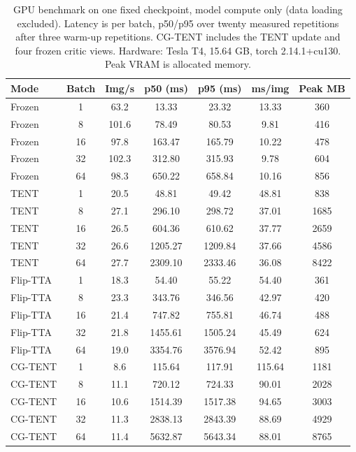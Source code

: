 \begin{table}[t]
\centering
\scriptsize
\setlength{\tabcolsep}{5pt}
\caption{GPU benchmark on one fixed checkpoint, model compute only (data loading excluded). Latency is per batch, p50/p95 over twenty measured repetitions after three warm-up repetitions. CG-TENT includes the TENT update and four frozen critic views. Hardware: Tesla T4, 15.64 GB, torch 2.14.1+cu130. Peak VRAM is allocated memory.}
\label{tab:timing-gpu}
\begin{tabular}{@{}lcccccc@{}}
\toprule
Mode & Batch & Img/s & p50 (ms) & p95 (ms) & ms/img & Peak MB \\
\midrule
Frozen & 1 & 63.2 & 13.33 & 23.32 & 13.33 & 360 \\
Frozen & 8 & 101.6 & 78.49 & 80.53 & 9.81 & 416 \\
Frozen & 16 & 97.8 & 163.47 & 165.79 & 10.22 & 478 \\
Frozen & 32 & 102.3 & 312.80 & 315.93 & 9.78 & 604 \\
Frozen & 64 & 98.3 & 650.22 & 658.84 & 10.16 & 856 \\
TENT & 1 & 20.5 & 48.81 & 49.42 & 48.81 & 838 \\
TENT & 8 & 27.1 & 296.10 & 298.72 & 37.01 & 1685 \\
TENT & 16 & 26.5 & 604.36 & 610.62 & 37.77 & 2659 \\
TENT & 32 & 26.6 & 1205.27 & 1209.84 & 37.66 & 4586 \\
TENT & 64 & 27.7 & 2309.10 & 2333.46 & 36.08 & 8422 \\
Flip-TTA & 1 & 18.3 & 54.40 & 55.22 & 54.40 & 361 \\
Flip-TTA & 8 & 23.3 & 343.76 & 346.56 & 42.97 & 420 \\
Flip-TTA & 16 & 21.4 & 747.82 & 755.81 & 46.74 & 488 \\
Flip-TTA & 32 & 21.8 & 1455.61 & 1505.24 & 45.49 & 624 \\
Flip-TTA & 64 & 19.0 & 3354.76 & 3576.94 & 52.42 & 895 \\
CG-TENT & 1 & 8.6 & 115.64 & 117.91 & 115.64 & 1181 \\
CG-TENT & 8 & 11.1 & 720.12 & 724.33 & 90.01 & 2028 \\
CG-TENT & 16 & 10.6 & 1514.39 & 1517.38 & 94.65 & 3003 \\
CG-TENT & 32 & 11.3 & 2838.13 & 2843.39 & 88.69 & 4929 \\
CG-TENT & 64 & 11.4 & 5632.87 & 5643.34 & 88.01 & 8765 \\
\bottomrule
\end{tabular}
\end{table}
